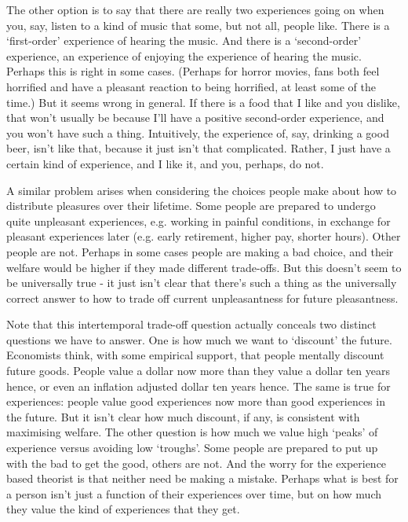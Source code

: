 The other option is to say that there are really two experiences going on when you, say, listen to a kind of music that some, but not all, people like. There is a `first-order' experience of hearing the music. And there is a `second-order' experience, an experience of enjoying the experience of hearing the music. Perhaps this is right in some cases. (Perhaps for horror movies, fans both feel horrified and have a pleasant reaction to being horrified, at least some of the time.) But it seems wrong in general. If there is a food that I like and you dislike, that won't usually be because I'll have a positive second-order experience, and you won't have such a thing. Intuitively, the experience of, say, drinking a good beer, isn't like that, because it just isn't that complicated. Rather, I just have a certain kind of experience, and I like it, and you, perhaps, do not.

A similar problem arises when considering the choices people make about how to distribute pleasures over their lifetime. Some people are prepared to undergo quite unpleasant experiences, e.g. working in painful conditions, in exchange for pleasant experiences later (e.g. early retirement, higher pay, shorter hours). Other people are not. Perhaps in some cases people are making a bad choice, and their welfare would be higher if they made different trade-offs. But this doesn't seem to be universally true - it just isn't clear that there's such a thing as the universally correct answer to how to trade off current unpleasantness for future pleasantness.

Note that this intertemporal trade-off question actually conceals two distinct questions we have to answer. One is how much we want to `discount' the future. Economists think, with some empirical support, that people mentally discount future goods. People value a dollar now more than they value a dollar ten years hence, or even an inflation adjusted dollar ten years hence. The same is true for experiences: people value good experiences now more than good experiences in the future. But it isn't clear how much discount, if any, is consistent with maximising welfare. The other question is how much we value high `peaks' of experience versus avoiding low `troughs'. Some people are prepared to put up with the bad to get the good, others are not. And the worry for the experience based theorist is that neither need be making a mistake. Perhaps what is best for a person isn't just a function of their experiences over time, but on how much they value the kind of experiences that they get.


